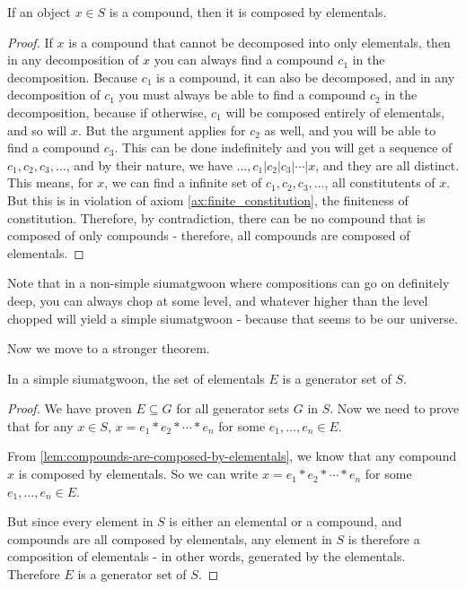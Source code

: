 \begin{lemma}\label{lem:compounds-are-composed-by-elementals}
    If an object $x\in S$ is a compound, then it is composed by elementals.
\end{lemma}
\begin{proof}

    If $x$ is a compound that cannot be decomposed into only elementals, then in any decomposition of $x$ you can always find a compound $c_1$ in the decomposition. Because $c_1$ is a compound, it can also be decomposed, and in any decomposition of $c_1$ you must always be able to find a compound $c_2$ in the decomposition, because if otherwise, $c_1$ will be composed entirely of elementals, and so will $x$. But the argument applies for $c_2$ as well, and you will be able to find a compound $c_3$. This can be done indefinitely and you will get a sequence of $c_1, c_2, c_3, \ldots$, and by their nature, we have  $\ldots, c_1|c_2|c_3|\cdots|x$, and they are all distinct. This means, for $x$, we can find a infinite set of $c_1, c_2, c_3, \ldots$, all constitutents of $x$. But this is in violation of axiom \ref{ax:finite_constitution}, the finiteness of constitution. Therefore, by contradiction, there can be no compound that is composed of only compounds - therefore, all compounds are composed of elementals.
\end{proof}


Note that in a non-simple siumatgwoon where compositions can go on definitely deep, you can always chop at some level, and whatever higher than the level chopped will yield a simple siumatgwoon - because that seems to be our universe. 


Now we move to a stronger theorem.

\begin{theorem}\label{thm:elementals-are-a-generator-set-in-simple-siumatgwoons} 
    In a simple siumatgwoon, the set of elementals $E$ is a generator set of $S$.
\end{theorem}

\begin{proof}
    We have proven $E\subseteq G$ for all generator sets $G$ in $S$. Now we need to prove that for any $x\in S$, $x = e_1 * e_2 * \cdots * e_n$ for some $e_1, \dots, e_n \in E$.

    From \ref{lem:compounds-are-composed-by-elementals}, we know that any compound $x$ is composed by elementals. So we can write $x = e_1 * e_2 * \cdots * e_n$ for some $e_1, \dots, e_n \in E$.

    But since every element in $S$ is either an elemental or a compound, and compounds are all composed by elementals, any element in $S$ is therefore a composition of elementals - in other words, generated by the elementals. Therefore $E$ is a generator set of $S$.
\end{proof}


